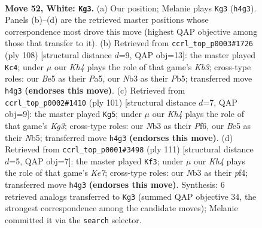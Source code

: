 \documentclass[11pt]{article}
\begin{document}
\clearpage

\begin{figure}[p]\centering
\begin{subfigure}{0.46\textwidth}\centering
\resizebox{\linewidth}{!}{%
\newchessgame
\chessboard[
  setfen={5k2/2P5/2r5/4B3/7K/1N6/8/8 w - - 17 52},
  showmover=false,
  pgfstyle=straightmove, color=movearrow, markmove={h4-g3}
]}
\caption{}
\end{subfigure}\hfill
\begin{subfigure}{0.46\textwidth}\centering
\resizebox{\linewidth}{!}{%
\newchessgame
\chessboard[
  setfen={1k6/8/8/PP1B4/8/1K6/8/3r4 w - - 1 55},
  showmover=false,
  pgfstyle=straightmove, color=movearrow, markmove={b3-c4}
]}
\caption{}
\end{subfigure}
\\[4pt]
\begin{subfigure}{0.46\textwidth}\centering
\resizebox{\linewidth}{!}{%
\newchessgame
\chessboard[
  setfen={8/8/5pk1/1n6/5p1R/8/1K6/8 b - - 0 51},
  showmover=false,
  pgfstyle=straightmove, color=movearrow, markmove={g6-g5}
]}
\caption{}
\end{subfigure}\hfill
\begin{subfigure}{0.46\textwidth}\centering
\resizebox{\linewidth}{!}{%
\newchessgame
\chessboard[
  setfen={8/8/2p3R1/3b4/5P2/8/4k3/2K5 b - - 0 56},
  showmover=false,
  pgfstyle=straightmove, color=movearrow, markmove={e2-f3}
]}
\caption{}
\end{subfigure}
\caption{\textbf{Move 52, White: \texttt{Kg3}.} (a) Our position; Melanie plays \texttt{Kg3} (\texttt{h4g3}). Panels (b)--(d) are the retrieved master positions whose correspondence most drove this move (highest QAP objective among those that transfer to it). (b) Retrieved from \texttt{ccrl\_top\_p0003\#1726} (ply 108) [structural distance $d$=9, QAP obj=13]: the master played \texttt{Kc4}; under $\mu$ our \emph{Kh4} plays the role of that game's \emph{Kb3}; cross-type roles: our \emph{B}e5 as their \emph{P}a5, our \emph{N}b3 as their \emph{P}b5; transferred move \texttt{h4g3} \textbf{(endorses this move)}. (c) Retrieved from \texttt{ccrl\_top\_p0002\#1410} (ply 101) [structural distance $d$=7, QAP obj=9]: the master played \texttt{Kg5}; under $\mu$ our \emph{Kh4} plays the role of that game's \emph{Kg3}; cross-type roles: our \emph{N}b3 as their \emph{P}f6, our \emph{B}e5 as their \emph{N}b5; transferred move \texttt{h4g3} \textbf{(endorses this move)}. (d) Retrieved from \texttt{ccrl\_top\_p0001\#3498} (ply 111) [structural distance $d$=5, QAP obj=7]: the master played \texttt{Kf3}; under $\mu$ our \emph{Kh4} plays the role of that game's \emph{Ke7}; cross-type roles: our \emph{N}b3 as their \emph{p}f4; transferred move \texttt{h4g3} \textbf{(endorses this move)}. Synthesis: 6 retrieved analogs transferred to \texttt{Kg3} (summed QAP objective 34, the strongest correspondence among the candidate moves); Melanie committed it via the \texttt{search} selector.}
\label{fig:thought-m102}
\end{figure}
\end{document}
